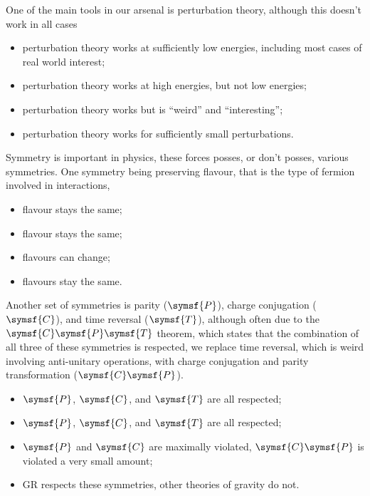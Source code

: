 \documentclass[fleqn]{NotesClass}
\newcommand{\chargeConjugation}{\symsf{C}}
\newcommand{\parity}{\symsf{P}}
\newcommand{\timeReversal}{\symsf{T}}
\begin{document}
    One of the main tools in our arsenal is perturbation theory, although this doesn't work in all cases
    \begin{itemize}
        \item perturbation theory works at sufficiently low energies, including most cases of real world interest;
        \item perturbation theory works at high energies, but not low energies;
        \item perturbation theory works but is \enquote{weird} and \enquote{interesting};
        \item perturbation theory works for sufficiently small perturbations.
    \end{itemize}
    
    Symmetry is important in physics, these forces posses, or don't posses, various symmetries.
    One symmetry being preserving flavour, that is the type of fermion involved in interactions,
    \begin{itemize}
        \item flavour stays the same;
        \item flavour stays the same;
        \item flavours can change;
        \item flavours stay the same.
    \end{itemize}
    Another set of symmetries is parity (\(\parity\)), charge conjugation (\(\chargeConjugation\)), and time reversal (\(\timeReversal\)), although often due to the \(\chargeConjugation\parity\timeReversal\) theorem, which states that the combination of all three of these symmetries is respected, we replace time reversal, which is weird involving anti-unitary operations, with charge conjugation and parity transformation (\(\chargeConjugation\parity\)).
    \begin{itemize}
        \item \(\parity\), \(\chargeConjugation\), and \(\timeReversal\) are all respected;
        \item \(\parity\), \(\chargeConjugation\), and \(\timeReversal\) are all respected;
        \item \(\parity\) and \(\chargeConjugation\) are maximally violated, \(\chargeConjugation\parity\) is violated a very small amount;
        \item GR respects these symmetries, other theories of gravity do not.
    \end{itemize}
    
\end{document}
